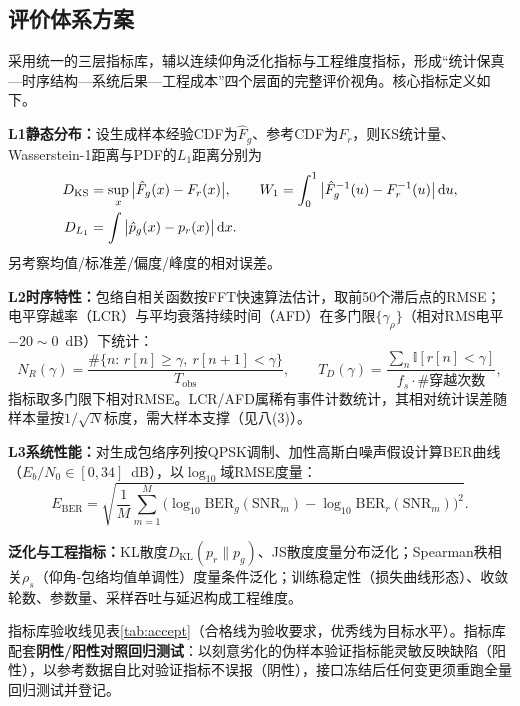 \documentclass[12pt, a4paper]{ctexart}
\begin{document}
\subsection{评价体系方案}
采用统一的三层指标库，辅以连续仰角泛化指标与工程维度指标，形成“统计保真—时序结构—系统后果—工程成本”四个层面的完整评价视角。核心指标定义如下。

\textbf{L1静态分布：}设生成样本经验CDF为$\hat{F}_g$、参考CDF为$F_r$，则KS统计量、Wasserstein-1距离与PDF的$L_1$距离分别为
\begin{align}
D_{\text{KS}} &= \sup_x \big|\hat{F}_g(x) - F_r(x)\big|,\qquad
W_1 = \int_0^1 \big|\hat{F}_g^{-1}(u) - F_r^{-1}(u)\big|\,\mathrm{d}u,\notag\\
D_{L_1} &= \int \big|\hat{p}_g(x) - p_r(x)\big|\,\mathrm{d}x.
\label{eq:l1}
\end{align}
另考察均值/标准差/偏度/峰度的相对误差。

\textbf{L2时序特性：}包络自相关函数按FFT快速算法估计，取前50个滞后点的RMSE；电平穿越率（LCR）与平均衰落持续时间（AFD）在多门限$\{\gamma_\rho\}$（相对RMS电平$-20\sim0$~dB）下统计：
\begin{equation}
N_R(\gamma) = \frac{\#\{n:\, r[n]\ge\gamma,\ r[n{+}1]<\gamma\}}{T_{\text{obs}}},\qquad
T_D(\gamma) = \frac{\sum_n \mathbb{I}[r[n]<\gamma]}{f_s \cdot \#\text{穿越次数}},
\end{equation}
指标取多门限下相对RMSE。LCR/AFD属稀有事件计数统计，其相对统计误差随样本量按$1/\sqrt{N}$标度，需大样本支撑（见八(3)）。

\textbf{L3系统性能：}对生成包络序列按QPSK调制、加性高斯白噪声假设计算BER曲线（$E_b/N_0\in[0,34]$~dB），以$\log_{10}$域RMSE度量：
\begin{equation}
E_{\text{BER}} = \sqrt{\frac{1}{M}\sum_{m=1}^{M}\big(\log_{10}\text{BER}_g(\text{SNR}_m) - \log_{10}\text{BER}_r(\text{SNR}_m)\big)^2}.
\label{eq:ber}
\end{equation}

\textbf{泛化与工程指标：}KL散度$D_{\text{KL}}(p_r\|p_g)$、JS散度度量分布泛化；Spearman秩相关$\rho_s$（仰角-包络均值单调性）度量条件泛化；训练稳定性（损失曲线形态）、收敛轮数、参数量、采样吞吐与延迟构成工程维度。

指标库验收线见表\ref{tab:accept}（合格线为验收要求，优秀线为目标水平）。指标库配套\textbf{阴性/阳性对照回归测试}：以刻意劣化的伪样本验证指标能灵敏反映缺陷（阳性），以参考数据自比对验证指标不误报（阴性），接口冻结后任何变更须重跑全量回归测试并登记。
\end{document}
